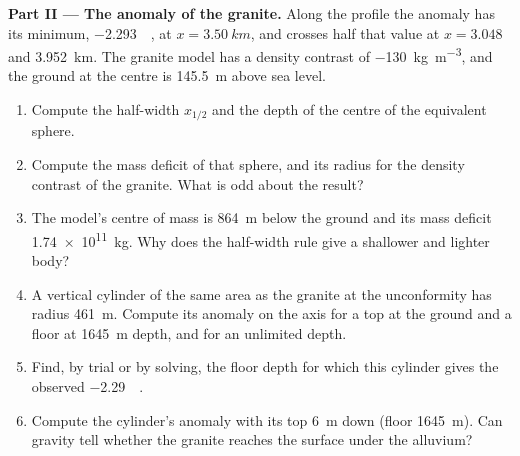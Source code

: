 \begin{problem}
\medskip\noindent\textbf{Part II --- The anomaly of the granite.} Along
the profile the anomaly has its minimum, \qty{-2.293}{\milli\gal}, at
$x = \qty{3.50}{km}$, and crosses half that value at $x = 3.048$ and
\qty{3.952}{km}. The granite model has a density contrast of
\qty{-130}{kg.m^{-3}}, and the ground at the centre is \qty{145.5}{m}
above sea level.
\begin{enumerate}[resume]
\item Compute the half-width $x_{1/2}$ and the depth of the centre of
  the equivalent sphere.
\item Compute the mass deficit of that sphere, and its radius for the
  density contrast of the granite. What is odd about the result?
\item The model's centre of mass is \qty{864}{m} below the ground and its
  mass deficit \qty{1.74e11}{kg}. Why does the half-width rule give a
  shallower and lighter body?
\item A vertical cylinder of the same area as the granite at the
  unconformity has radius \qty{461}{m}. Compute its anomaly on the axis
  for a top at the ground and a floor at \qty{1645}{m} depth, and for an
  unlimited depth.
\item Find, by trial or by solving, the floor depth for which this
  cylinder gives the observed \qty{-2.29}{\milli\gal}.
\item Compute the cylinder's anomaly with its top \qty{6}{m} down
  (floor \qty{1645}{m}). Can gravity tell whether the granite reaches
  the surface under the alluvium?
\end{enumerate}


\end{problem}
